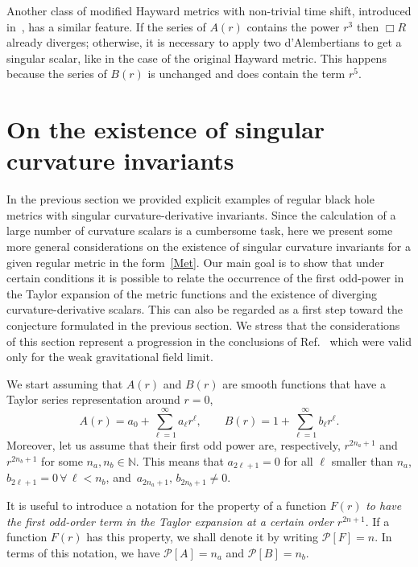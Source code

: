 \documentclass[aps,prd,a4paper,twocolumn,showpacs,showkeys,preprintnumbers,amsmath,amssymb,nofootinbib,usenames,dvipsnames]{revtex4-2}
\def\beq{\begin{equation}}
\def\eeq{\end{equation}}
\begin{document}
Another class of modified Hayward metrics with non-trivial time shift, introduced in~\cite{Frolov:2016pav}, has a similar feature. If the series of $A(r)$ contains the power $r^3$ then $\Box R$ already diverges; otherwise, it is necessary to apply two d'Alembertians to get a singular scalar, like in the case of the original Hayward metric. This happens because the series of $B(r)$ is unchanged and does contain the term $r^5$.


\section{On the existence of singular curvature invariants}
\label{Sec3}

In the previous section we provided explicit examples of regular black hole metrics with singular curvature-derivative invariants. Since the calculation of a large number of curvature scalars is a cumbersome task, here we present some more general considerations on the existence of singular curvature invariants for a given regular metric in the form~\eqref{Met}. Our main goal is to show that under certain conditions it is possible to relate the occurrence of the first odd-power in the Taylor expansion of the metric functions and the existence of diverging curvature-derivative scalars. This can also be regarded as a first step toward the conjecture formulated in the previous section. We stress that the considerations of this section represent a progression in the conclusions of Ref.~\cite{Nos6der} which were valid only for the weak gravitational field limit.

We start assuming that $A(r)$ and $B(r)$ are smooth functions that have a Taylor series representation around $r=0$,
\beq \label{SeriesAB}
A(r) = a_0 + \sum_{\ell=1}^{\infty} a_\ell r^\ell  , \qquad
B(r) = 1 + \sum_{\ell=1}^{\infty} b_\ell r^\ell .
\eeq
%
Moreover, let us assume that their first odd power are, respectively, $r^{2n_a+1}$ and $r^{2n_b+1}$ for some $n_a,n_b \in \mathbb{N}$. This means that $a_{2\ell +1} = 0$ for all $\ell$ smaller than $n_a$, $b_{2\ell +1} = 0 \, \forall \, \ell < n_b$, and $\,a_{2n_a + 1}, \, b_{2n_b + 1}  \neq 0$.

It is useful to introduce a notation for the property of a function $F(r)$ \emph{to have the first odd-order term in the Taylor expansion at a certain order $r^{2n+1}$}. If a function $F(r)$ has this property, we shall denote it by writing $\mathcal{P}[F] = n$. In terms of this notation, we have $\mathcal{P}[A]=n_a$ and $\mathcal{P}[B]=n_b$.
\end{document}
